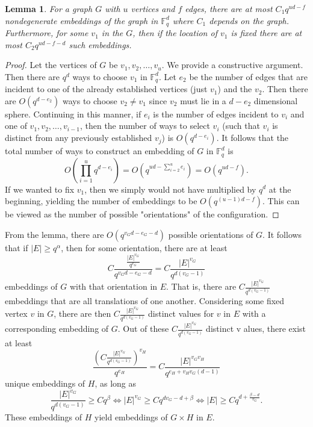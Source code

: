 \documentclass{article}
\newtheorem{lemma}[theorem]{Lemma}
\begin{document}
\begin{lemma}
For a graph $G$ with $u$ vertices and $f$ edges, there are at most $C_1q^{ud-f}$ nondegenerate embeddings of the graph in $\mathbb{F}_q^d$ where $C_1$ depends on the graph. Furthermore, for some $v_1$ in the $G$, then if the location of $v_1$ is fixed there are at most $C_2q^{ud-f-d}$ such embeddings.
\end{lemma}
\begin{proof}
Let the vertices of $G$ be $v_1, v_2, \dots, v_u$. We provide a constructive argument. Then there are $q^d$ ways to choose $v_1$ in $\mathbb{F}_q^d$. Let $e_2$ be the number of edges that are incident to one of the already established vertices (just $v_1$) and the $v_2$. Then there are $O(q^{d-e_2})$ ways to choose $v_2 \neq v_1$ since $v_2$ must lie in a $d-e_2$ dimensional sphere. Continuing in this manner, if $e_i$ is the number of edges incident to $v_i$ and one of $v_1, v_2, \dots, v_{i-1}$, then the number of ways to select $v_i$ (such that $v_i$ is distinct from any previously established $v_j$) is $O(q^{d-e_i})$. It follows that the total number of ways to construct an embedding of $G$ in $\mathbb{F}_q^d$ is
$$
O\left( \prod_{i=1}^u {q^{d-e_i}} \right) = O\left( q^{ud-\sum_{i=2}^u{e_i}} \right) = O\left( q^{ud-f} \right).
$$
If we wanted to fix $v_1$, then we simply would not have multiplied by $q^d$ at the beginning, yielding the number of embeddings to be $O(q^{(u-1)d-f})$. This can be viewed as the number of possible "orientations" of the configuration.
\end{proof} 

From the lemma, there are $O(q^{v_Gd-e_G-d})$ possible orientations of $G$. It follows that if $|E| \ge q^{\alpha}$, then for some orientation, there are at least $$C\frac{\frac{|E|^{v_G}}{q^{e_G}}}{q^{v_Gd-e_G-d}} = C\frac{|E|^{v_G}}{q^{d(v_G-1)}}$$
embeddings of $G$ with that orientation in $E$. That is, there are $C\frac{|E|^{v_G}}{q^{d(v_G-1)}}$ embeddings that are all translations of one another. Considering some fixed vertex $v$ in $G$, there are then $C\frac{|E|^{v_G}}{q^{d(v_G-1)}}$ distinct values for $v$ in $E$ with a corresponding embedding of $G$. Out of these $C\frac{|E|^{v_G}}{q^{d(v_G-1)}}$ distinct v alues, there exist at least
$$
\frac{\left(C\frac{|E|^{v_G}}{q^{d(v_G-1)}}\right)^{v_H}}{q^{e_H}} = C \frac{|E|^{v_Gv_H}}{q^{e_H + v_Hv_G(d-1)}}
$$
unique embeddings of $H$, as long as
$$
\frac{|E|^{v_G}}{q^{d(v_G-1)}} \ge Cq^{\beta} \iff |E|^{v_G} \ge Cq^{dv_G - d + \beta} \iff |E| \ge Cq^{d + \frac{\beta-d}{v_G}}.
$$
These embeddings of $H$ yield embeddings of $G\times H$ in $E$.
\end{document}
